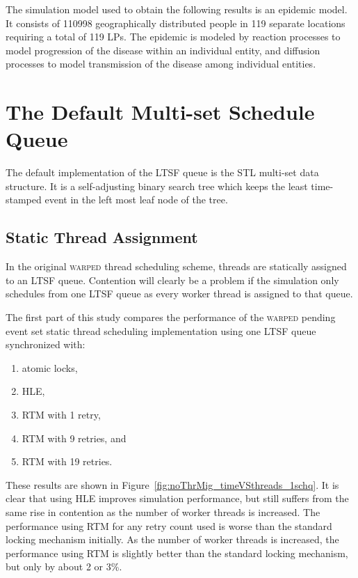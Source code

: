 \documentclass[11pt]{book}
\begin{document}
The simulation model used to obtain the following results is an epidemic model.  It
consists of 110998 geographically distributed people in 119 separate locations requiring a
total of 119 LPs.  The epidemic is modeled by reaction processes to model progression of
the disease within an individual entity, and diffusion processes to model transmission of
the disease among individual entities.

\section{The Default Multi-set Schedule Queue}

The default implementation of the LTSF queue is the STL multi-set data structure.  It is a
self-adjusting binary search tree which keeps the least time-stamped event in the left
most leaf node of the tree.

\subsection{Static Thread Assignment}

In the original \textsc{warped} thread scheduling scheme, threads are statically assigned
to an LTSF queue.  Contention will clearly be a problem if the simulation only schedules
from one LTSF queue as every worker thread is assigned to that queue.

The first part of this study compares the performance of the \textsc{warped} pending event
set static thread scheduling implementation using one LTSF queue synchronized with: 

\vspace*{-\bigskipamount}
\begin{singlespace}
\begin{enumerate}
  \item atomic locks, 
  \item HLE, 
  \item RTM with 1 retry, 
  \item RTM with 9 retries, and 
  \item RTM with 19 retries.  
\end{enumerate}
\end{singlespace}

\noindent
These results are shown in Figure~\ref{fig:noThrMig_timeVSthreads_1schq}.  It is clear
that using HLE improves simulation performance, but still suffers from the same rise in
contention as the number of worker threads is increased.  The performance using
RTM for any retry count used is worse than the standard locking mechanism
initially.  As the number of worker threads is increased, the performance using
RTM is slightly better than the standard locking mechanism, but only by about 2
or 3\%.
\end{document}

